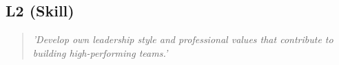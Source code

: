 \subsection*{L2 (Skill)}

  \begin{quote}
    \textit{'Develop own leadership style and professional
    values that contribute to building high-performing teams.'}
  \end{quote}

\newpage